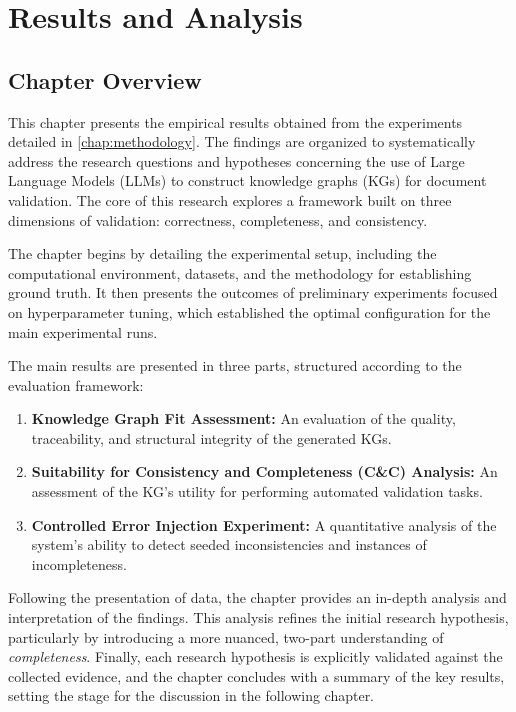 \chapter{Results and Analysis}
\label{chap:results}


\section{Chapter Overview}
\label{sec:results_overview}

This chapter presents the empirical results obtained from the experiments detailed in \cref{chap:methodology}. The findings are organized to systematically address the research questions and hypotheses concerning the use of Large Language Models (LLMs) to construct knowledge graphs (KGs) for document validation. The core of this research explores a framework built on three dimensions of validation: correctness, completeness, and consistency.

The chapter begins by detailing the experimental setup, including the computational environment, datasets, and the methodology for establishing ground truth. It then presents the outcomes of preliminary experiments focused on hyperparameter tuning, which established the optimal configuration for the main experimental runs.

The main results are presented in three parts, structured according to the evaluation framework:
\begin{enumerate}
    \item \textbf{Knowledge Graph Fit Assessment:} An evaluation of the quality, traceability, and structural integrity of the generated KGs.
    \item \textbf{Suitability for Consistency and Completeness (C\&C) Analysis:} An assessment of the KG's utility for performing automated validation tasks.
    \item \textbf{Controlled Error Injection Experiment:} A quantitative analysis of the system's ability to detect seeded inconsistencies and instances of incompleteness.
\end{enumerate}

Following the presentation of data, the chapter provides an in-depth analysis and interpretation of the findings. This analysis refines the initial research hypothesis, particularly by introducing a more nuanced, two-part understanding of \textit{completeness}. Finally, each research hypothesis is explicitly validated against the collected evidence, and the chapter concludes with a summary of the key results, setting the stage for the discussion in the following chapter.

